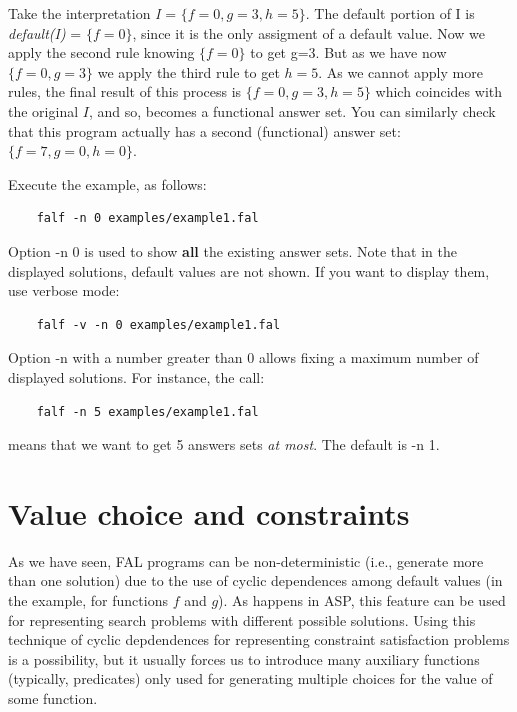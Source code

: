 \documentclass[a4paper,12pt]{report}
\begin{document}
Take the interpretation \textit{I} = $\{f=0, g=3, h=5\}$. The default portion of I is \textit{default(I)} = $\{f=0\}$, since it is the only assigment of a default value. Now we apply the second rule knowing $\{f=0\}$ to get g=3. But as we have now $\{f=0, g=3\}$ we apply the third rule to get $h=5$. As we cannot apply more rules, the final result of this process is $\{f=0, g=3, h=5\}$ which coincides with the original $I$, and so, becomes a functional answer set. You can similarly check that this program actually has a second (functional) answer set: $\{f=7, g=0, h=0\}$. 
\vspace{0.5cm}
\begin{mdframed}[backgroundcolor=blue!20] 
Execute the example, as follows:

\begin{verbatim}
	falf -n 0 examples/example1.fal
\end{verbatim}
Option {\color{red}-n 0} is used to show \textbf{all} the existing answer sets. Note that in the displayed solutions, default values are not shown. If you want to display them, use verbose mode:

\begin{verbatim}
	falf -v -n 0 examples/example1.fal
\end{verbatim}
Option -n with a number greater than 0 allows fixing a maximum number of displayed solutions. For instance, the call:

\begin{verbatim}
	falf -n 5 examples/example1.fal
\end{verbatim}
means that we want to get 5 answers sets \textit{at most}. The default is -n 1.
\end{mdframed}
\vspace{0.5cm}

\section{Value choice and constraints}
As we have seen, FAL programs can be non-deterministic (i.e., generate more than one solution) due to the use of cyclic dependences among default values (in the example, for functions $f$ and $g$). As happens in ASP, this feature can be used for representing search problems with different possible solutions. Using this technique of cyclic depdendences for representing constraint satisfaction problems is a possibility, but it usually forces us to introduce many auxiliary functions (typically, predicates) only used for generating multiple choices for the value of some function.
\end{document}
